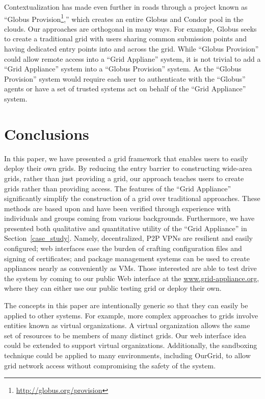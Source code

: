 \documentclass[twocolumn]{svjour3}
\begin{document}
Contextualization has made even further in roads through a project known as
``Globus Provision\footnote{\url{http://globus.org/provision}},'' which creates
an entire Globus and Condor pool in the clouds.  Our approaches are orthogonal
in many ways.  For example, Globus seeks to create a traditional grid with
users sharing common submission points and having dedicated entry points into
and across the grid.   While ``Globus Provision'' could allow remote access
into a ``Grid Appliane'' system, it is not trivial to add a ``Grid Appliance''
system into a ``Globus Provision'' system.  As the ``Globus Provision'' system
would require each user to authenticate with the ``Globus'' agents or have a
set of trusted systems act on behalf of the ``Grid Appliance'' system.

\section{Conclusions}
\label{conclusions}

In this paper, we have presented a grid framework that enables users to easily
deploy their own grids.  By reducing the entry barrier to constructing
wide-area grids, rather than just providing a grid, our approach teaches users
to create grids rather than providing access.  The features of the ``Grid
Appliance'' significantly simplify the construction of a grid over traditional
approaches.  These methods are based upon and have been verified through
experience with individuals and groups coming from various backgrounds.
Furthermore, we have presented both qualitative and quantitative utility of the
``Grid Appliance'' in Section~\ref{case_study}.  Namely, decentralized, P2P
VPNs are resilient and easily configured; web interfaces ease the burden of
crafting configuration files and signing of certificates; and package
management systems can be used to create appliances nearly as conveniently as
VMs.  Those interested are able to test drive the system by coming to our
public Web interface at the \url{www.grid-appliance.org}, where they can either
use our public testing grid or deploy their own.

The concepts in this paper are intentionally generic so that they can easily be
applied to other systems.  For example, more complex approaches to grids
involve entities known as virtual organizations.  A virtual organization allows
the same set of resources to be members of many distinct grids.  Our web
interface idea could be extended to support virtual organizations.
Additionally, the sandboxing technique could be applied to many environments,
including OurGrid, to allow grid network access without compromising the safety
of the system.
\end{document}
